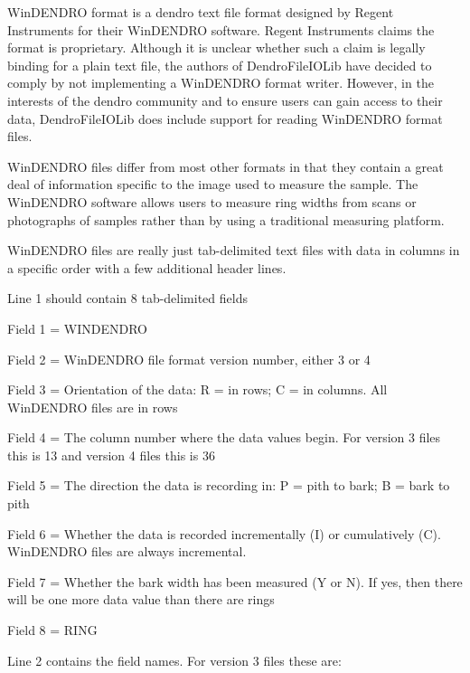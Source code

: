 WinDENDRO format is a dendro text file format designed by Regent Instruments for their WinDENDRO software. Regent Instruments claims the format is proprietary. Although it is unclear whether such a claim is legally binding for a plain text file, the authors of DendroFileIOLib have decided to comply by not implementing a WinDENDRO format writer. However, in the interests of the dendro community and to ensure users can gain access to their data, DendroFileIOLib does include support for reading WinDENDRO format files.

WinDENDRO files differ from most other formats in that they contain a great deal of information specific to the image used to measure the sample. The WinDENDRO software allows users to measure ring widths from scans or photographs of samples rather than by using a traditional measuring platform.

WinDENDRO files are really just tab-delimited text files with data in columns in a specific order with a few additional header lines.

Line 1 should contain 8 tab-delimited fields 

\begin{itemize*}
 \item Field 1 = WINDENDRO
 \item  Field 2 = WinDENDRO file format version number, either 3 or 4
 \item  Field 3 = Orientation of the data: R = in rows; C = in columns. All WinDENDRO files are in rows
 \item  Field 4 = The column number where the data values begin. For version 3 files this is 13 and version 4 files this is 36
 \item  Field 5 = The direction the data is recording in: P = pith to bark; B = bark to pith
 \item  Field 6 = Whether the data is recorded incrementally (I) or cumulatively (C). WinDENDRO files are always incremental.
 \item  Field 7 = Whether the bark width has been measured (Y or N). If yes, then there will be one more data value than there are rings
 \item  Field 8 = RING 
\end{itemize*}

Line 2 contains the field names.  For version 3 files these are:

